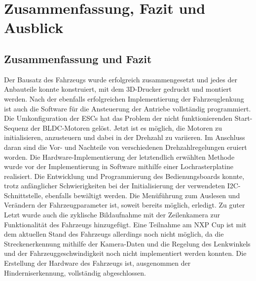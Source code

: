 

\pagestyle{fancy}
\rhead{\thepage} \chead{} 
\cfoot{}

\section{Zusammenfassung, Fazit und Ausblick}\label{Sec11}


\subsection{Zusammenfassung und Fazit}\label{Sec11Sub1}

Der Bausatz des Fahrzeugs wurde erfolgreich zusammengesetzt und jedes der Anbauteile konnte konstruiert, mit dem 3D-Drucker gedruckt und montiert werden. Nach der ebenfalls erfolgreichen Implementierung der Fahrzeuglenkung ist auch die Software für die Ansteuerung der Antriebe vollständig programmiert. Die Umkonfiguration der ESCs hat das Problem der nicht funktionierenden Start-Sequenz der BLDC-Motoren gelöst. Jetzt ist es möglich, die Motoren zu initialisieren, anzusteuern und dabei in der Drehzahl zu variieren. Im Anschluss daran sind die Vor- und Nachteile von verschiedenen Drehzahlregelungen eruiert worden. Die Hardware-Implementierung der letztendlich erwählten Methode wurde vor der Implementierung in Software mithilfe einer Lochrasterplatine realisiert. Die Entwicklung und Programmierung des Bedienungsboards konnte, trotz anfänglicher Schwierigkeiten bei der Initialisierung der verwendeten \ac{I2C}-Schnittstelle, ebenfalls bewältigt werden. Die Menüführung zum Auslesen und Verändern der Fahrzeugparameter ist, soweit bereits möglich, erledigt. Zu guter Letzt wurde auch die zyklische Bildaufnahme mit der Zeilenkamera zur Funktionalität des Fahrzeugs hinzugefügt. Eine Teilnahme am NXP Cup ist mit dem aktuellen Stand des Fahrzeugs allerdings noch nicht möglich, da die Streckenerkennung mithilfe der Kamera-Daten und die Regelung des Lenkwinkels und der Fahrzeuggeschwindigkeit noch nicht implementiert werden konnten. Die Erstellung der Hardware des Fahrzeugs ist, ausgenommen der Hinderniserkennung, vollständig abgeschlossen.\vspace{11pt}

